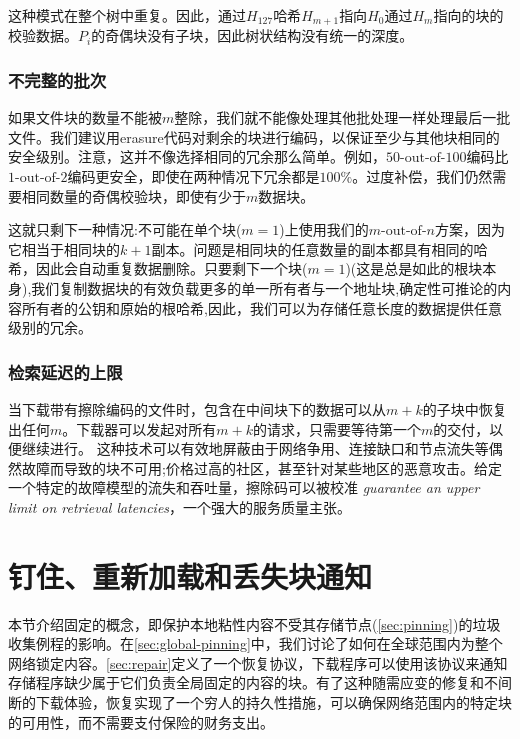 这种模式在整个树中重复。因此，通过$H_{127}$哈希$H_{m+1}$指向$H_0$通过$H_{m}$指向的块的校验数据。$P_i$的奇偶块没有子块，因此树状结构没有统一的深度。

\subsubsection{不完整的批次}

如果文件块的数量不能被$m$整除，我们就不能像处理其他批处理一样处理最后一批文件。我们建议用erasure代码对剩余的块进行编码，以保证至少与其他块相同的安全级别。注意，这并不像选择相同的冗余那么简单。例如，$50\text{-out-of-}100$编码比$1\text{-out-of-}2$编码更安全，即使在两种情况下冗余都是$100\%$。过度补偿，我们仍然需要相同数量的奇偶校验块，即使有少于$m$数据块。

这就只剩下一种情况:不可能在单个块($m=1$)上使用我们的$m\text{-out-of-}n$方案，因为它相当于相同块的$k+1$副本。问题是相同块的任意数量的副本都具有相同的哈希，因此会自动重复数据删除。只要剩下一个块($m=1$)(这是总是如此的根块本身),我们复制数据块的有效负载更多的单一所有者与一个地址块,确定性可推论的内容所有者的公钥和原始的根哈希,因此，我们可以为存储任意长度的数据提供任意级别的冗余。

\subsubsection{检索延迟的上限}

当下载带有擦除编码的文件时，包含在中间块下的数据可以从$m+k$的子块中恢复出任何$m$。下载器可以发起对所有$m+k$的请求，只需要等待第一个$m$的交付，以便继续进行。
这种技术可以有效地屏蔽由于网络争用、连接缺口和节点流失等偶然故障而导致的块不可用;价格过高的社区，甚至针对某些地区的恶意攻击。给定一个特定的故障模型的流失和吞吐量，擦除码可以被校准
\emph{guarantee an upper limit on retrieval latencies}，一个强大的服务质量主张。





\section{钉住、重新加载和丢失块通知\statusyellow}\label{sec:reupload}

本节介绍固定的概念，即保护本地粘性内容不受其存储节点(\ref{sec:pinning})的垃圾收集例程的影响。在\ref{sec:global-pinning}中，我们讨论了如何在全球范围内为整个网络锁定内容。\ref{sec:repair}定义了一个恢复协议，下载程序可以使用该协议来通知存储程序缺少属于它们负责全局固定的内容的块。有了这种随需应变的修复和不间断的下载体验，恢复实现了一个穷人的持久性措施，可以确保网络范围内的特定块的可用性，而不需要支付保险的财务支出。

